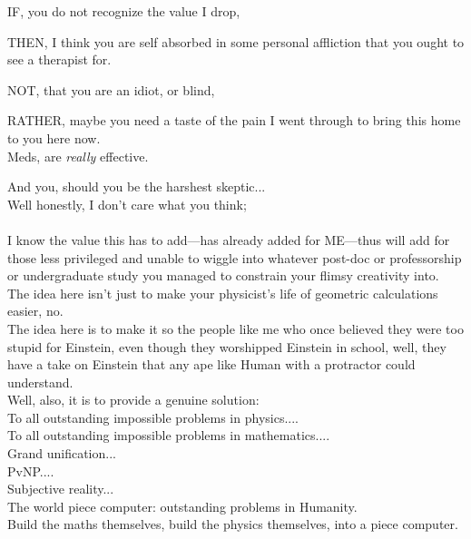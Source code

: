 \documentclass{article}
\begin{document}
\noindent IF, you do not recognize the value I drop,

\noindent THEN, I think you are self absorbed in some personal affliction that you ought to see a therapist for.

\noindent NOT, that you are an idiot, or blind,

\noindent RATHER, maybe you need a taste of the pain I went through to bring this home to you here now.\\

Meds, are {\em really} effective.

\noindent And you, should you be the harshest skeptic...\\

\noindent Well honestly, I don't care what you think;\\
\\

I know the value this has to add---has already added for ME---thus will add for those less privileged and unable to wiggle into whatever post-doc or professorship or undergraduate study you managed to constrain your flimsy creativity into.\\

\noindent The idea here isn't just to make your physicist's life of geometric calculations easier, no.\\

\noindent The idea here is to make it so the people like me who once believed they were too stupid for Einstein, even though they worshipped Einstein in school, well, they have a take on Einstein that any ape like Human with a protractor could understand.\\

Well, also, it is to provide a genuine solution:\\

\noindent To all outstanding impossible problems in physics....\\
\noindent To all outstanding impossible problems in mathematics....\\

\noindent Grand unification...\\
\noindent PvNP....\\
\noindent Subjective reality...\\

The world piece computer: outstanding problems in Humanity.\\
Build the maths themselves, build the physics themselves, into a piece computer.\\
\end{document}
